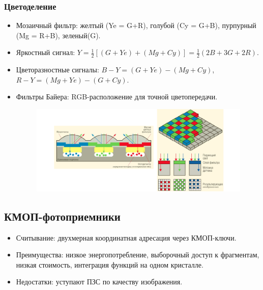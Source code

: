 	\newpage
	
	\subsubsection{Цветоделение}
	\begin{itemize}[leftmargin=1.75em]
		\item Мозаичный фильтр: желтый (Ye = G+R), голубой (Cy = G+B), пурпурный (Mg = R+B), зеленый(G).
		\item Яркостный сигнал: \( Y = \frac{1}{2}[(G+Ye) + (Mg+Cy)] = \frac{1}{2}(2B + 3G + 2R) \).
		\item Цветоразностные сигналы: \( B - Y = (G+Ye) - (Mg+Cy) \), \( R - Y = (Mg+Ye) - (G+Cy) \).
		\item Фильтры Байера: RGB-расположение для точной цветопередачи.
		\vspace{-0.5em}
		\begin{figure}[H]
			\centering
			\includegraphics[width=1\linewidth, height=0.275\textheight]{img/04_03}
			\label{fig:04_03}
		\end{figure}
	\end{itemize}
	\vspace{-5.75em}
	\subsection{КМОП-фотоприемники}
	\begin{itemize}
		\item Считывание: двухмерная координатная адресация через КМОП-ключи.
		\item Преимущества: низкое энергопотребление, выборочный доступ к фрагментам, низкая стоимость, интеграция функций на одном кристалле.
		\item Недостатки: уступают ПЗС по качеству изображения.
	\end{itemize}
	\vspace{-1.25em}
